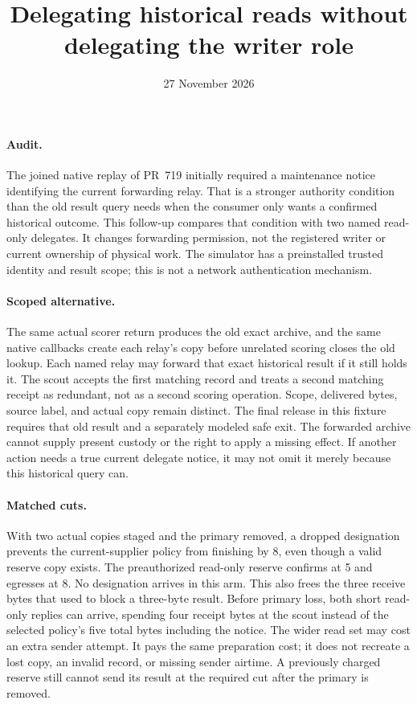 \documentclass[11pt]{article}
\title{Delegating historical reads without delegating the writer role}
\date{27 November 2026}
\begin{document}
\maketitle
\paragraph{Audit.}
The joined native replay of PR~719 initially required a
maintenance notice identifying the current forwarding relay.
That is a stronger authority condition than the old result
query needs when the consumer only wants a confirmed
historical outcome. This follow-up compares that condition with
two named read-only delegates. It changes forwarding permission,
not the registered writer or current ownership of physical work.
The simulator has a preinstalled trusted identity and result
scope; this is not a network authentication mechanism.

\paragraph{Scoped alternative.}
The same actual scorer return produces the old exact archive,
and the same native callbacks create each relay's copy before
unrelated scoring closes the old lookup. Each named relay may
forward that exact historical result if it still holds it.
The scout accepts the first matching record and treats a
second matching receipt as redundant, not as a second scoring
operation. Scope, delivered bytes, source label, and actual
copy remain distinct. The final release in this fixture
requires that old result and a separately modeled safe exit.
The forwarded archive cannot supply present custody or the
right to apply a missing effect. If another action needs
a true current delegate notice, it may not omit it merely
because this historical query can.

\paragraph{Matched cuts.}
With two actual copies staged and the primary removed, a dropped
designation prevents the current-supplier policy from finishing
by 8, even though a valid reserve copy exists. The
preauthorized read-only reserve confirms at 5 and egresses
at 8. No designation arrives in this arm. This also frees
the three receive bytes that used to block a three-byte
result. Before primary loss, both short read-only replies
can arrive, spending four receipt bytes at the scout
instead of the selected policy's five total bytes including
the notice. The wider read set may cost an extra sender
attempt. It pays the same preparation cost; it does not
recreate a lost copy, an invalid record, or missing sender
airtime. A previously charged reserve still cannot send
its result at the required cut after the primary is removed.
\end{document}
